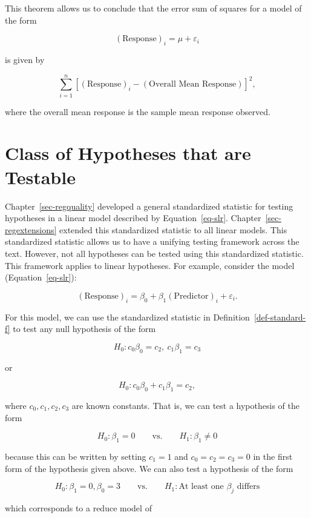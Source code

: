 \documentclass[
  letterpaper,
  DIV=11,
  numbers=noendperiod]{scrreprt}
\theoremstyle{plain}
\theoremstyle{definition}
\theoremstyle{definition}
\theoremstyle{remark}
\begin{document}
This theorem allows us to conclude that the error sum of squares for a
model of the form

\[(\text{Response})_i = \mu + \varepsilon_i\]

is given by

\[\sum_{i=1}^{n} \left[(\text{Response})_i - (\text{Overall Mean Response})\right]^2,\]

where the overall mean response is the sample mean response observed.

\hypertarget{class-of-hypotheses-that-are-testable}{%
\section{Class of Hypotheses that are
Testable}\label{class-of-hypotheses-that-are-testable}}

Chapter~\ref{sec-regquality} developed a general standardized statistic
for testing hypotheses in a linear model described by
Equation~\ref{eq-slr}. Chapter~\ref{sec-regextensions} extended this
standardized statistic to all linear models. This standardized statistic
allows us to have a unifying testing framework across the text. However,
not all hypotheses can be tested using this standardized statistic. This
framework applies to linear hypotheses. For example, consider the model
(Equation~\ref{eq-slr}):

\[(\text{Response})_i = \beta_0 + \beta_1 (\text{Predictor})_i + \varepsilon_i.\]

For this model, we can use the standardized statistic in
Definition~\ref{def-standard-f} to test any null hypothesis of the form

\[H_0: c_0\beta_0 = c_2, \ c_1\beta_1 = c_3\]

or

\[H_0: c_0\beta_0 + c_1\beta_1 = c_2,\]

where \(c_0, c_1, c_2, c_3\) are known constants. That is, we can test a
hypothesis of the form

\[H_0: \beta_1 = 0 \qquad \text{vs.} \qquad H_1: \beta_1 \neq 0\]

because this can be written by setting \(c_1 = 1\) and
\(c_0 = c_2 = c_3 = 0\) in the first form of the hypothesis given above.
We can also test a hypothesis of the form

\[H_0: \beta_1 = 0, \beta_0 = 3 \qquad \text{vs.} \qquad H_1: \text{At least one } \beta_j \text{ differs}\]

which corresponds to a reduce model of
\end{document}
